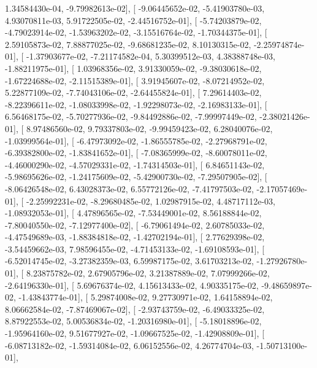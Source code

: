 \documentclass{article}
\begin{document}
          1.34584430e-04,  -9.79982613e-02],
       [ -9.06445652e-02,  -5.41903780e-03,   4.93070811e-03,
          5.91722505e-02,  -2.44516752e-01],
       [ -5.74203879e-02,  -4.79023914e-02,  -1.53963202e-02,
         -3.15516764e-02,  -1.70344375e-01],
       [  2.59105873e-02,   7.88877025e-02,  -9.68681235e-02,
          8.10130315e-02,  -2.25974874e-01],
       [ -1.37903677e-02,  -7.21174582e-04,   5.30399512e-03,
          4.38388748e-03,  -1.88211975e-01],
       [  1.03968356e-02,   3.91330059e-02,  -9.38030618e-02,
         -1.67224688e-02,  -2.11515389e-01],
       [  3.91945607e-02,  -8.07214952e-02,   5.22877109e-02,
         -7.74043106e-02,  -2.64455824e-01],
       [  7.29614403e-02,  -8.22396611e-02,  -1.08033998e-02,
         -1.92298073e-02,  -2.16983133e-01],
       [  6.56468175e-02,  -5.70277936e-02,  -9.84492886e-02,
         -7.99997449e-02,  -2.38021426e-01],
       [  8.97486560e-02,   9.79337803e-02,  -9.99459423e-02,
          6.28040076e-02,  -1.03999564e-01],
       [ -6.47973092e-02,  -1.86555785e-02,  -2.27968791e-02,
         -6.39382800e-02,  -1.83841652e-01],
       [ -7.08365999e-02,  -8.60078011e-02,  -4.46000290e-02,
         -4.57029331e-02,  -1.74314503e-01],
       [  6.84651143e-02,  -5.98695626e-02,  -1.24175609e-02,
         -5.42900730e-02,  -7.29507905e-02],
       [ -8.06426548e-02,   6.43028373e-02,   6.55772126e-02,
         -7.41797503e-02,  -2.17057469e-01],
       [ -2.25992231e-02,  -8.29680485e-02,   1.02987915e-02,
          4.48717112e-03,  -1.08932053e-01],
       [  4.47896565e-02,  -7.53449001e-02,   8.56188844e-02,
         -7.80040550e-02,  -7.12977400e-02],
       [ -6.79061494e-02,   2.60785033e-02,  -4.47549689e-03,
         -1.88384818e-02,  -1.42702194e-01],
       [  2.77629398e-02,  -3.54459662e-03,   7.98596455e-02,
         -4.71453133e-02,  -1.69108593e-01],
       [ -6.52014745e-02,  -3.27382359e-03,   6.59987175e-02,
          3.61703213e-02,  -1.27926780e-01],
       [  8.23875782e-02,   2.67905796e-02,   3.21387889e-02,
          7.07999266e-02,  -2.64196330e-01],
       [  5.69676374e-02,   4.15613433e-02,   4.90335175e-02,
         -9.48659897e-02,  -1.43843774e-01],
       [  5.29874008e-02,   9.27730971e-02,   1.64158894e-02,
          8.06662584e-02,  -7.87469067e-02],
       [ -2.93743759e-02,  -6.49033325e-02,   8.87922553e-02,
          5.00536834e-02,  -1.20316980e-01],
       [ -5.18018896e-02,  -1.95964160e-02,   9.51677927e-02,
         -1.09667525e-02,  -1.42908809e-01],
       [ -6.08713182e-02,  -1.59314084e-02,   6.06152556e-02,
          4.26774704e-03,  -1.50713100e-01],
\end{document}
